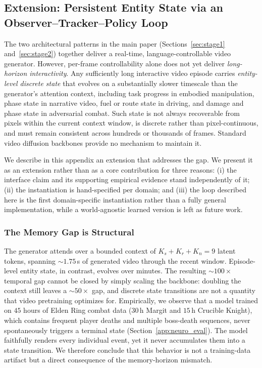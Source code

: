 \subsection{Extension: Persistent Entity State via an Observer--Tracker--Policy Loop}
\label{app:persistent_state}

The two architectural patterns in the main paper (Sections~\ref{sec:stage1} and~\ref{sec:stage2}) together deliver a real-time, language-controllable video generator. However, per-frame controllability alone does not yet deliver \emph{long-horizon interactivity}. Any sufficiently long interactive video episode carries \emph{entity-level discrete state} that evolves on a substantially slower timescale than the generator's attention context, including task progress in embodied manipulation, phase state in narrative video, fuel or route state in driving, and damage and phase state in adversarial combat. Such state is not always recoverable from pixels within the current context window, is discrete rather than pixel-continuous, and must remain consistent across hundreds or thousands of frames. Standard video diffusion backbones provide no mechanism to maintain it.

We describe in this appendix an extension that addresses the gap. We present it as an extension rather than as a core contribution for three reasons: (i) the interface claim and its supporting empirical evidence stand independently of it; (ii) the instantiation is hand-specified per domain; and (iii) the loop described here is the first domain-specific instantiation rather than a fully general implementation, while a world-agnostic learned version is left as future work.

\subsubsection{The Memory Gap is Structural}
\label{app:memory_gap}

The generator attends over a bounded context of $K_s + K_r + K_n = 9$ latent tokens, spanning ${\sim}1.75$\,s of generated video through the recent window. Episode-level entity state, in contrast, evolves over minutes. The resulting ${\sim}100\times$ temporal gap cannot be closed by simply scaling the backbone: doubling the context still leaves a ${\sim}50\times$ gap, and discrete state transitions are not a quantity that video pretraining optimizes for. Empirically, we observe that a model trained on $45$ hours of Elden Ring combat data ($30$\,h Margit and $15$\,h Crucible Knight), which contains frequent player deaths and multiple boss-death sequences, never spontaneously triggers a terminal state (Section~\ref{app:neuro_eval}). The model faithfully renders every individual event, yet it never accumulates them into a state transition. We therefore conclude that this behavior is not a training-data artifact but a direct consequence of the memory-horizon mismatch.

